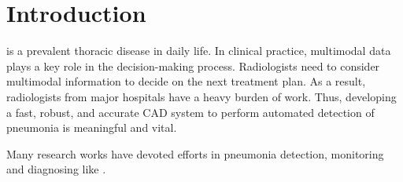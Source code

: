 \documentclass[journal]{IEEEtran}
\begin{document}
%
\IEEEpeerreviewmaketitle

\newpage
\section{Introduction}
\label{intro}
% 
% 
% 
% 

 is a prevalent thoracic disease in daily life. In clinical practice, multimodal data plays a key role in the decision-making process. Radiologists need to consider multimodal information to decide on the next treatment plan. As a result, radiologists from major hospitals have a heavy burden of work. Thus, developing a fast, robust, and accurate CAD system to perform automated detection of pneumonia is meaningful and vital. 

Many research works have devoted efforts in pneumonia detection, monitoring and diagnosing like \cite{Shin2016Learning, deepika2018classification, iakovidis2012image}.
\end{document}
